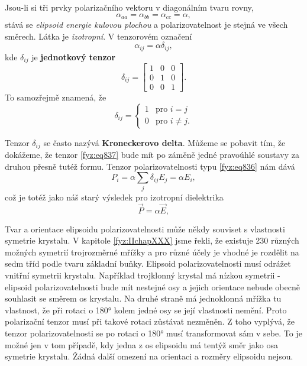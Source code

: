     Jsou-li si tři prvky polarizačního vektoru v diagonálním tvaru rovny,
    \begin{equation}\label{fyz:eq835}
        \alpha_{aa} = \alpha_{bb} = \alpha_{cc} = \alpha,
    \end{equation}
    stává se \emph{elipsoid energie kulovou plochou} a polarizovatelnost je stejná ve všech směrech.
    Látka je \emph{izotropní}. V tenzorovém označení
    \begin{equation}\label{fyz:eq836}
      \alpha_{ij} = \alpha\delta_{ij},
    \end{equation}
    kde \(\delta_{ij}\) je \textbf{jednotkový tenzor}
    \begin{equation}\label{fyz:eq837}
      \delta_{ij} = 
      \begin{bmatrix}
             1 & 0 & 0 \\
             0 & 1 & 0 \\
             0 & 0 & 1  
      \end{bmatrix}.
    \end{equation}
    To samozřejmě znamená, že
    \begin{equation}\label{fyz:eq838}
      \delta_{ij} = 
      \begin{cases} 
         1  & \text{pro } i = j     \\
         0  & \text{pro } i \neq j.
      \end{cases}
    \end{equation}

    Tenzor \(\delta_{ij}\) se často nazývá \textbf{Kroneckerovo delta}. Můžeme se pobavit tím, že
    dokážeme, že tenzor \eqref{fyz:eq837} bude mít po záměně jedné pravoúhlé soustavy za druhou
    přesně tutéž formu. Tenzor polarizovatelnosti typu \eqref{fyz:eq836} nám dává
    \begin{equation*}
      P_i = \alpha\sum_j\delta_{ij}E_j = \alpha E_i,
    \end{equation*}
    což je totéž jako náš starý výsledek pro izotropní dielektrika
    \begin{equation*}
      \vec{P} = \alpha\vec{E},
    \end{equation*}

    Tvar a orientace elipsoidu polarizovatelnosti může někdy souviset s vlastnosti symetrie
    krystalu. V kapitole \ref{fyz:IIchapXXX} jsme řekli, že existuje 230 různých možných symetrií
    trojrozměrné mřížky a pro různé účely je vhodné je rozdělit na sedm tříd podle tvaru základní
    buňky. Elipsoid polarizovatelnosti musí odrážet vnitřní symetrii krystalu. Například trojklonný
    krystal má nízkou symetrii - elipsoid polarizovatelnosti bude mít nestejné osy a jejich
    orientace nebude obecně souhlasit se směrem os krystalu. Na druhé straně má jednoklonná mřížka
    tu vlastnost, že při rotaci o \ang{180} kolem jedné osy se její vlastnosti nemění. Proto
    polarizační tenzor musí při takové rotaci zůstávat nezměněn. Z toho vyplývá, že tenzor
    polarizovatelnosti se po rotaci o \ang{180} musí transformovat sám v sebe. To je možné jen v tom
    případě, kdy jedna z os elipsoidu má tentýž směr jako osa symetrie krystalu. Žádná další omezení
    na orientaci a rozměry elipsoidu nejsou.
    
